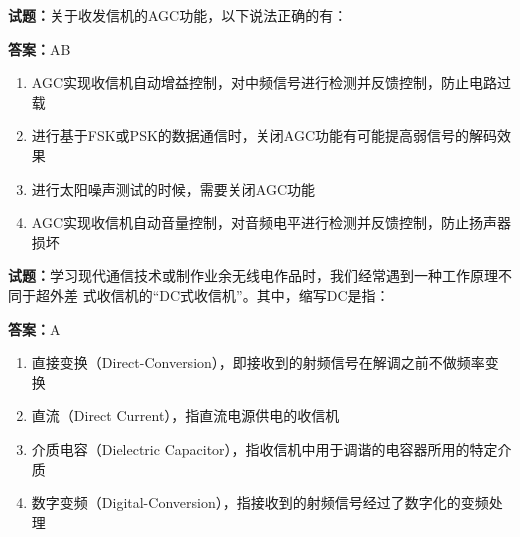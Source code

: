 \documentclass{ctexbook}
\begin{document}




\vspace{1em}

\textbf{试题：}关于收发信机的AGC功能，以下说法正确的有： 

\textbf{答案：}AB 

\begin{enumerate}[leftmargin=3em]
  \item AGC实现收信机自动增益控制，对中频信号进行检测并反馈控制，防止电路过载 

  \item 进行基于FSK或PSK的数据通信时，关闭AGC功能有可能提高弱信号的解码效果 

  \item 进行太阳噪声测试的时候，需要关闭AGC功能 

  \item AGC实现收信机自动音量控制，对音频电平进行检测并反馈控制，防止扬声器损坏 

\end{enumerate}





\vspace{1em}

\textbf{试题：}学习现代通信技术或制作业余无线电作品时，我们经常遇到一种工作原理不同于超外差
式收信机的“DC式收信机”。其中，缩写DC是指： 

\textbf{答案：}A 

\begin{enumerate}[leftmargin=3em]
  \item 直接变换（Direct-Conversion），即接收到的射频信号在解调之前不做频率变换 

  \item 直流（Direct Current），指直流电源供电的收信机 

  \item 介质电容（Dielectric Capacitor），指收信机中用于调谐的电容器所用的特定介质 

  \item 数字变频（Digital-Conversion），指接收到的射频信号经过了数字化的变频处理 

\end{enumerate}



\end{document}
